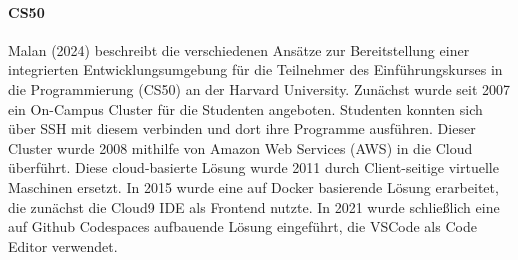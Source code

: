 \paragraph{CS50}
Malan (2024) \cite{malan_containerizing_2024} beschreibt die verschiedenen Ansätze zur Bereitstellung einer integrierten Entwicklungsumgebung für die Teilnehmer des Einführungskurses in die Programmierung (CS50) an der Harvard University. Zunächst wurde seit 2007 ein On-Campus Cluster für die Studenten angeboten. Studenten konnten sich über SSH mit diesem verbinden und dort ihre Programme ausführen. Dieser Cluster wurde 2008 mithilfe von Amazon Web Services (AWS) \cite{noauthor_amazon_nodate} in die Cloud überführt. Diese cloud-basierte Lösung wurde 2011 durch Client-seitige virtuelle Maschinen ersetzt. In 2015 wurde eine auf Docker basierende Lösung erarbeitet, die zunächst die Cloud9 IDE \cite{noauthor_aws-cloud9_nodate} als Frontend nutzte. In 2021 wurde schließlich eine auf Github Codespaces aufbauende Lösung eingeführt, die \ac{VSCode} \cite{noauthor_vscode_nodate} als Code Editor verwendet.